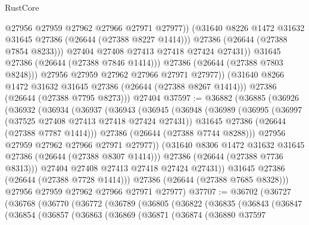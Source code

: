 \begin{lexlean}{RustCore}
\begin{coremodule}
                        @27956
                        @27959
                        @27962
                        @27966
                        @27971
                        @27977))
                    (@31640 @8226 @1472 @31632 @31645 @27386 (@26644 (@27388 @8227 @1414)))
                    @27386
                    (@26644 (@27388 @7854 @8233)))
                  @27404
                  @27408
                  @27413
                  @27418
                  @27424
                  @27431))
              @31645
              @27386
              (@26644 (@27388 @7846 @1414)))
            @27386
            (@26644 (@27388 @7803 @8248)))
          @27956
          @27959
          @27962
          @27966
          @27971
          @27977))
      (@31640 @8266 @1472 @31632 @31645 @27386 (@26644 (@27388 @8267 @1414)))
      @27386
      (@26644 (@27388 @7795 @8273)))
    @27404
@37597 := @36882
    (@36885
      (@36926
        (@36932
          (@36934
            (@36937
              (@36943
                (@36945
                  (@36948
                    (@36989
                      (@36995
                        (@36997 (@37525 @27408 @27413 @27418 @27424 @27431))
                        @31645
                        @27386
                        (@26644 (@27388 @7787 @1414)))
                      @27386
                      (@26644 (@27388 @7744 @8288)))
                    @27956
                    @27959
                    @27962
                    @27966
                    @27971
                    @27977))
                (@31640 @8306 @1472 @31632 @31645 @27386 (@26644 (@27388 @8307 @1414)))
                @27386
                (@26644 (@27388 @7736 @8313)))
              @27404
              @27408
              @27413
              @27418
              @27424
              @27431))
          @31645
          @27386
          (@26644 (@27388 @7728 @1414)))
        @27386
        (@26644 (@27388 @7685 @8328)))
      @27956
      @27959
      @27962
      @27966
      @27971
      @27977)
@37707 := @36702
    (@36727
      (@36768
        (@36770
          (@36772
            (@36789
              (@36805
                (@36822
                  (@36835
                    (@36843
                      (@36847
                        (@36854
                          (@36857
                            (@36863
                              (@36869
                                (@36871
                                  (@36874
                                    (@36880
                                      @37597

\end{coremodule}
\end{lexlean}

